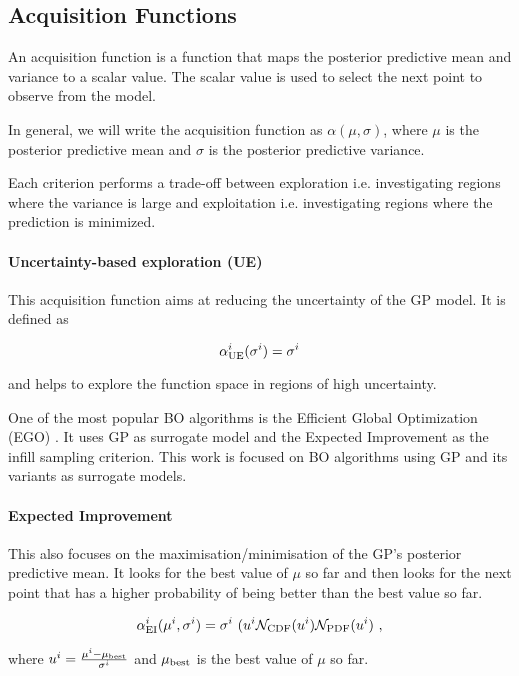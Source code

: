 \documentclass[twocolumn]{aastex631}
\begin{document}
\subsection{Acquisition Functions}

An acquisition function is a function that maps the posterior predictive mean and variance to a scalar value. The scalar value is used to select the next point to observe from the model.

In general, we will write the acquisition function as $\alpha(\mu,\sigma)$, where $\mu$ is the posterior predictive mean and $\sigma$ is the posterior predictive variance.

Each criterion performs a trade-off between exploration i.e. investigating regions where the variance is large and exploitation i.e. investigating regions where the prediction is minimized. 

\paragraph{Uncertainty-based exploration (UE)}

This acquisition function aims at reducing the uncertainty of the GP model. It is defined as

$$
\alpha_{\rm{UE}}^i(\sigma^i)= \sigma^i
$$

and helps to explore the function space in regions of high uncertainty.

One of the most popular BO algorithms is the Efficient Global Optimization (EGO) \cite{jones1998efficient}. 
It uses GP as surrogate model and the Expected Improvement as the infill sampling criterion. This work is focused on BO algorithms using GP and its variants as surrogate models.


\paragraph{Expected Improvement}

This also focuses on the maximisation/minimisation of the GP's posterior predictive mean.
It looks for the best value of $\mu$ so far and then looks for the next point that has a higher probability of being better than the best value so far.

$$
\alpha_{\rm{EI}}^i(\mu^i, \sigma^i)= \sigma^i\ (u^i \mathcal{N}_{\rm CDF}(u^i) \mathcal{N}_{\rm PDF}(u^i)\ ,
$$

where $u^i = \frac{\mu^i - \mu_{\rm{best}}}{\sigma^i}$ and $\mu_{\rm{best}}$ is the best value of $\mu$ so far.
\end{document}

